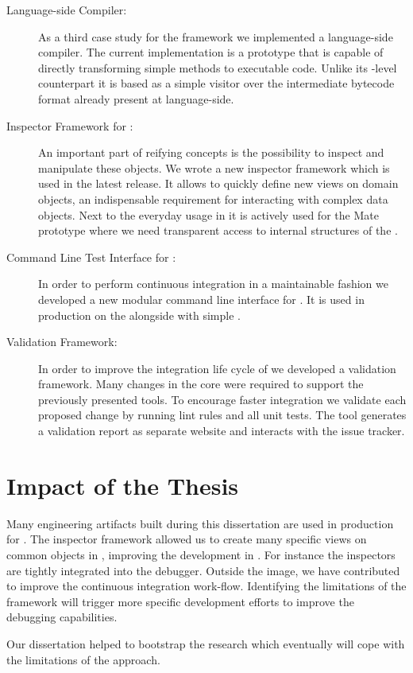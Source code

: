 \begin{description}
	\item[\NBJ Language-side \JIT Compiler:]
		As a third case study for the \B framework we implemented a language-side \JIT compiler. 
		The current implementation is a prototype that is capable of directly transforming simple methods to executable code.
		Unlike its \VM-level counterpart it is based as a simple visitor over the intermediate bytecode format already present at language-side.

	\item[Inspector Framework for \PH:] 
		An important part of reifying concepts is the possibility to inspect and manipulate these objects.
		We wrote a new inspector framework which is used in the latest \PH release.
		It allows to quickly define new views on domain objects, an indispensable requirement for interacting with complex data objects.
		Next to the everyday usage in \PH it is actively used for the Mate \VM prototype where we need transparent access to internal structures of the \VM.

	\item[Command Line Test Interface for \PH:]
		In order to perform continuous integration in a maintainable fashion we developed a new modular command line interface for \PH. 
		It is used in production on the  alongside with simple .
		
	\item[Validation Framework:]
		In order to improve the integration life cycle of \PH we developed a validation framework.
		Many changes in the core \PH were required to support the previously presented tools.
		To encourage faster integration we validate each proposed change by running lint rules and all unit tests.
		The tool generates a validation report as separate website and interacts with the issue tracker.
\end{description}


\section{Impact of the Thesis}
Many engineering artifacts built during this dissertation are used in production for \PH.
The inspector framework allowed us to create many specific views on common objects in \PH, improving the development in \PH.
For instance the inspectors are tightly integrated into the debugger.
Outside the image, we have contributed to improve the \PH continuous integration work-flow.
Identifying the limitations of the \B framework will trigger more specific development efforts to improve the debugging capabilities.

Our dissertation helped to bootstrap the \Mate research \VM which eventually will cope with the limitations of the \B approach.


